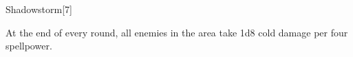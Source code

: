 \begin{spellsection}{Shadowstorm}[7]
    \begin{spellheader}
    \end{spellheader}
    \begin{spellcontent}
        \begin{spelltargetinginfo}
        \end{spelltargetinginfo}
        \begin{spelleffects}
            \spelleffect At the end of every round, all enemies in the area take 1d8 cold damage per four spellpower.
        \end{spelleffects}
    \end{spellcontent}
    \begin{spellfooter}
        \miscastexplode
    \end{spellfooter}
\end{spellsection}


